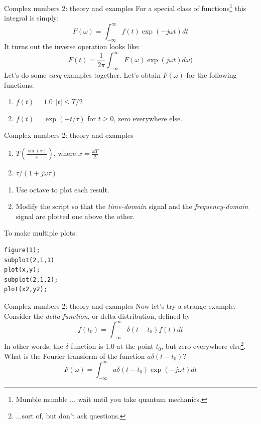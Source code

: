\documentclass{beamer}
\begin{document}
\begin{frame}[fragile]{Complex numbers 2: theory and examples}
\small
For a special class of functions\footnote{Mumble mumble ... wait until you take quantum mechanics.} this integral is simply:
\begin{equation}
\boxed{
F(\omega) = \int_{-\infty}^{\infty} f(t) \exp(-j\omega t) dt}
\end{equation}
It turns out the inverse operation looks like:
\begin{equation}
\boxed{
F(t) = \frac{1}{2\pi} \int_{-\infty}^{\infty} F(\omega) \exp(j\omega t) d\omega)}
\end{equation}
Let's do some \textit{easy} examples together.  Let's obtain $F(\omega)$ for the following functions:
\begin{enumerate}
\item $f(t) = 1.0 ~~ |t| \leq T/2$
\item $f(t) = \exp(-t/\tau)$ for $t \geq 0$, zero everywhere else.
\end{enumerate}
\end{frame}

\begin{frame}[fragile]{Complex numbers 2: theory and examples}
\small
\begin{enumerate}
\item $T \left(\frac{\sin(x)}{x}\right)$, where $x = \frac{\omega T}{2}$
\item $\tau/(1+j\omega \tau)$
\end{enumerate}
\begin{enumerate}
\item Use octave to plot each result.
\item Modify the script so that the \textit{time-domain} signal and the \textit{frequency-domain} signal are plotted one above the other.
\end{enumerate}
To make multiple plots:
\begin{verbatim}
figure(1);
subplot(2,1,1)
plot(x,y);
subplot(2,1,2);
plot(x2,y2);
\end{verbatim}
\end{frame}

\begin{frame}[fragile]{Complex numbers 2: theory and examples}
\small
Now let's try a strange example.  Consider the \textit{delta-function}, or delta-distribution, defined by
\begin{equation}
f(t_0) = \int_{-\infty}^{\infty} \delta(t-t_0) f(t) dt
\end{equation}
In other words, the $\delta$-function is 1.0 at the point $t_0$, but zero everywhere else\footnote{...sort of, but don't ask questions.}.  What is the Fourier transform of the function $a\delta(t-t_0)$?
\begin{equation}
F(\omega) = \int_{-\infty}^{\infty} a\delta(t-t_0) \exp(-j\omega t) dt
\end{equation}
\end{frame}
\end{document}
